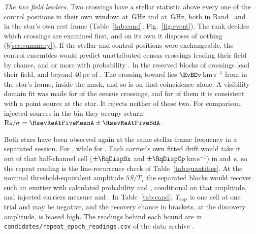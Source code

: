\label{sec:vistest}%
\emph{The two field leaders.} Two crossings have a stellar statistic above
every one of the \NCtrl{} control positions in their own window: \EvAStar{}
at \RqFreqSx\,GHz and \EvBStar{} at \RqFreqCp\,GHz, both in Band~\EvABand{}
and in the star's own rest frame (Table~\ref{tab:cand};
Fig.~\ref{fig:event}). The rank decides which crossings are examined first,
and on its own it disposes of nothing (\S\ref{sec:summary}). If the stellar
and control positions were exchangeable, the control ensembles would predict
\RkCondExp{} unattributed census crossings leading their field by chance,
and \RkCondNObsWord{} or more with probability \RkCondProb. In the reserved
blocks \RkHoLead{} of \RkHoN{} crossings lead their field, and beyond 40\,pc
\RkOosLead{} of \RkOosN. The crossing toward \EvBStar{} lies
$\EvBDv$\,km\,s$^{-1}$ from \EvBLine{} in the star's frame, inside the mask,
and so is \EvBDispo{} on that coincidence alone. A visibility-domain fit
was made for \CsNVisFit{} of the \CsNCross{} census crossings, and for
\CsNVisLocal{} of them it is consistent with a point source at the star. It
rejects neither of these two. For comparison, injected sources in the bin
they occupy return ${\rm Re}/\sigma=
\RsevReAtFiveMeanA\pm\RsevReAtFiveSdA$.

Both stars have been observed again at the same stellar-frame frequency in a
separated session. For \EvAStar{} \RcSxSepClause, while for \EvBStar{}
\RcCpSepClause. Each carrier's own fitted drift would take it out of that
half-channel cell ($\pm\RqDispSx$ and $\pm\RqDispCp$\,km\,s$^{-1}$) in
\ZtSxLeaveSec{} and \ZtCpLeaveSec\,s, so the repeat reading is the
line-recurrence check of Table~\ref{tab:quantities}. At the nominal
threshold-equivalent amplitude $5S/T_\star$ the separated blocks would
recover such an emitter with calculated probability \RcSxPowerTrig{} and
\RcCpPowerTrig, conditional on that amplitude, and injected carriers measure
\HjMeasSx{} and \HjMeasCp. In Table~\ref{tab:cand}, $T_{\rm rep}$ is one cell
at one trial and may be negative, and the recovery chance in brackets, at the
discovery amplitude, is biased high. The readings behind each bound are in
\texttt{candidates/repeat\_epoch\_readings.csv} of the data archive
\citep{SIdeposit}.

